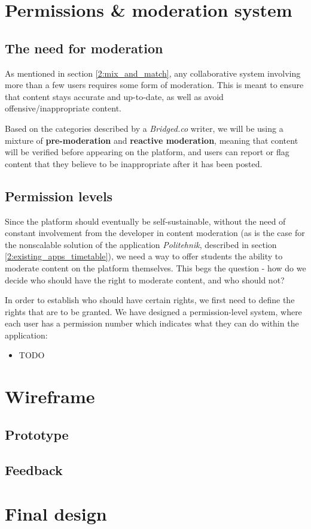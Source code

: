\section{Permissions \& moderation system} \label{4:permissions}

\subsection{The need for moderation} \label{4:permissions_need}

As mentioned in section \ref{2:mix_and_match}, any collaborative system involving more than a few users requires some form of moderation\cite{roberts2019behind}. This is meant to ensure that content stays accurate and up-to-date, as well as avoid offensive/inappropriate content.

Based on the categories described by a \textit{Bridged.co} writer\cite{bridged2019moderation}, we will be using a mixture of \textbf{pre-moderation} and \textbf{reactive moderation}, meaning that content will be verified before appearing on the platform, and users can report or flag content that they believe to be inappropriate after it has been posted.

\subsection{Permission levels} \label{4:permissions_levels}

Since the platform should eventually be self-sustainable, without the need of constant involvement from the developer in content moderation (as is the case for the nonscalable solution of the application \textit{Politehnik}, described in section \ref{2:existing_apps_timetable}), we need a way to offer students the ability to moderate content on the platform themselves. This begs the question - how do we decide who should have the right to moderate content, and who should not?

In order to establish who should have certain rights, we first need to define the rights that are to be granted. We have designed a permission-level system, where each user has a permission number which indicates what they can do within the application:

\begin{itemize}
    \setlength{\topsep}{0.5pt}
    \setlength{\itemsep}{0.5pt}
    \setlength{\parsep}{0.5pt}
    \item TODO
\end{itemize}

\section{Wireframe} \label{4:wireframe}

\subsection{Prototype} \label{4:wireframe_prototype}

\subsection{Feedback} \label{4:wireframe_feedback}

\section{Final design} \label{4:final}